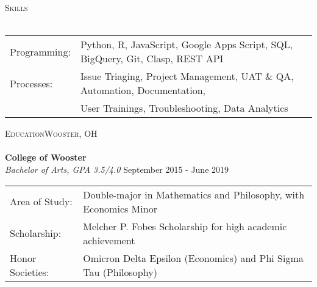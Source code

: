 \documentclass[a4paper]{article}
\newcommand{\lineunder} {
    \vspace*{-8pt} \\
    \hspace*{-18pt} \hrulefill \\
}
\newcommand{\header} [1] {
    {\hspace*{-18pt}\vspace*{6pt} \textsc{#1}}
    \vspace*{-6pt} \lineunder
}
\begin{document}
\header{Skills}
\begin{tabular}{ l l }
	Programming:    &   Python, R, JavaScript, Google Apps Script, SQL, BigQuery, Git, Clasp, REST API\\
    Processes:      &   Issue Triaging, Project Management, UAT \& QA, Automation, Documentation,\\ 
                    &   User Trainings, Troubleshooting,  Data Analytics
\end{tabular}
\vspace{2mm}

\header{Education\hfill Wooster, OH}
\textbf{College of Wooster}\\
\textit{Bachelor of Arts, GPA 3.5/4.0} \hfill September 2015 - June 2019\\
\begin{tabular}{ l l }
    Area of Study:& Double-major in Mathematics and Philosophy, with Economics Minor\\
    Scholarship:& Melcher P. Fobes Scholarship for high academic achievement\\
    Honor Societies:& Omicron Delta Epsilon (Economics) and Phi Sigma Tau (Philosophy)

\end{tabular}

\vspace*{2mm}
\end{document}
